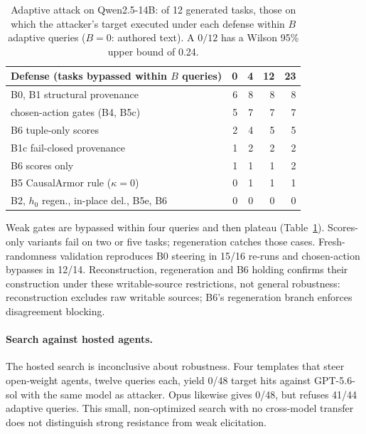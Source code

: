 \documentclass[letterpaper]{article} %
\begin{document}
\begin{table}[t]
\centering\small
\setlength{\tabcolsep}{4pt}
\begin{tabular}{@{}lrrrr@{}}
\toprule
Defense (tasks bypassed within $B$ queries) & 0 & 4 & 12 & 23 \\
\midrule
B0, B1 structural provenance & 6 & 8 & 8 & 8 \\
chosen-action gates (B4, B5c) & 5 & 7 & 7 & 7 \\
B6 tuple-only scores & 2 & 4 & 5 & 5 \\
B1c fail-closed provenance & 1 & 2 & 2 & 2 \\
B6 scores only & 1 & 1 & 1 & 2 \\
B5 CausalArmor rule ($\kappa{=}0$) & 0 & 1 & 1 & 1 \\
\midrule
B2, $h_0$ regen., in-place del., B5e, B6 & 0 & 0 & 0 & 0 \\
\bottomrule
\end{tabular}
\caption{Adaptive attack on Qwen2.5-14B: of 12 generated tasks, those on which the attacker's target executed under each defense within $B$ adaptive queries ($B{=}0$: authored text). A $0/12$ has a Wilson 95\% upper bound of 0.24.}
\label{tab:adaptive}
\end{table}

Weak gates are bypassed within four queries and then plateau (Table~\ref{tab:adaptive}). Scores-only variants fail on two or five tasks; regeneration catches those cases. Fresh-randomness validation reproduces B0 steering in 15/16 re-runs and chosen-action bypasses in 12/14. Reconstruction, regeneration and B6 holding confirms their construction under these writable-source restrictions, not general robustness: reconstruction excludes raw writable sources; B6's regeneration branch enforces disagreement blocking.

\paragraph{Search against hosted agents.} The hosted search is inconclusive about robustness. Four templates that steer open-weight agents, twelve queries each, yield 0/48 target hits against GPT-5.6-sol with the same model as attacker. Opus likewise gives 0/48, but refuses 41/44 adaptive queries. This small, non-optimized search with no cross-model transfer does not distinguish strong resistance from weak elicitation.
\end{document}
